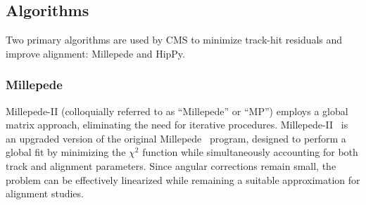






\subsection{Algorithms}

Two primary algorithms are used by CMS to minimize track-hit residuals and improve alignment: Millepede and HipPy. 

\subsubsection{Millepede}

Millepede-II (colloquially referred to as ``Millepede'' or ``MP'') employs a global matrix approach, eliminating the need for iterative procedures. Millepede-II~\cite{BLOBEL20065} is an upgraded version of the original Millepede~\cite{blobel2002newmethodhighprecisionalignment} program, designed to perform a global fit by minimizing the $\chi^2$ function while simultaneously accounting for both track and alignment parameters. Since angular corrections remain small, the problem can be effectively linearized while remaining a suitable approximation for alignment studies.

